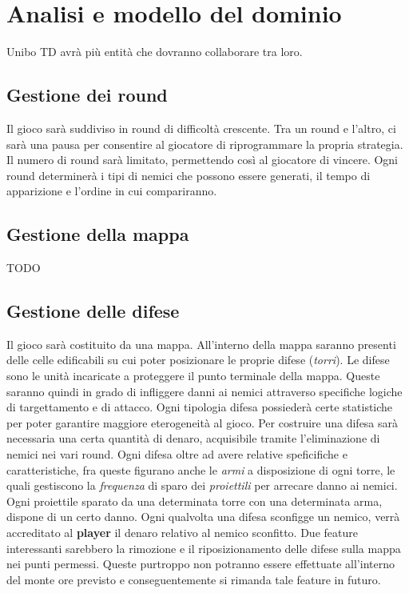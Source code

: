 \documentclass[a4paper,12pt]{report}
\begin{document}
\section{Analisi e modello del dominio}

Unibo TD avrà più entità che dovranno collaborare tra loro.

\subsection*{Gestione dei round}
Il gioco sarà suddiviso in round di difficoltà crescente. Tra un round e l'altro, ci sarà una pausa per consentire al giocatore di riprogrammare la propria strategia. Il numero di round sarà limitato, permettendo così al giocatore di vincere.
Ogni round determinerà i tipi di nemici che possono essere generati, il tempo di apparizione e l'ordine in cui compariranno.

\subsection*{Gestione della mappa}
TODO

\subsection*{Gestione delle difese}
Il gioco sarà costituito da una mappa. All'interno della mappa saranno presenti delle celle edificabili su cui poter posizionare le proprie difese (\textit{torri}). 
Le difese sono le unità incaricate a proteggere il punto terminale della mappa. Queste saranno quindi in grado di infliggere danni ai nemici attraverso specifiche logiche di targettamento e di attacco. Ogni tipologia difesa possiederà certe statistiche per poter garantire maggiore eterogeneità al gioco. Per costruire una difesa sarà necessaria una certa quantità di denaro, acquisibile tramite l'eliminazione di nemici nei vari round. Ogni difesa oltre ad avere relative speficifiche e caratteristiche, fra queste figurano anche le \textit{armi} a disposizione di ogni torre, le quali gestiscono la \textit{frequenza} di sparo dei \textit{proiettili} per arrecare danno ai nemici. Ogni proiettile sparato da una determinata torre con una determinata arma, dispone di un certo danno. Ogni qualvolta una difesa sconfigge un nemico, verrà accreditato al \textbf{player} il denaro relativo al nemico sconfitto. Due feature interessanti sarebbero la rimozione e il riposizionamento delle difese sulla mappa nei punti permessi. Queste purtroppo non potranno essere effettuate all’interno del monte ore previsto e conseguentemente si rimanda tale feature in futuro.
\end{document}
